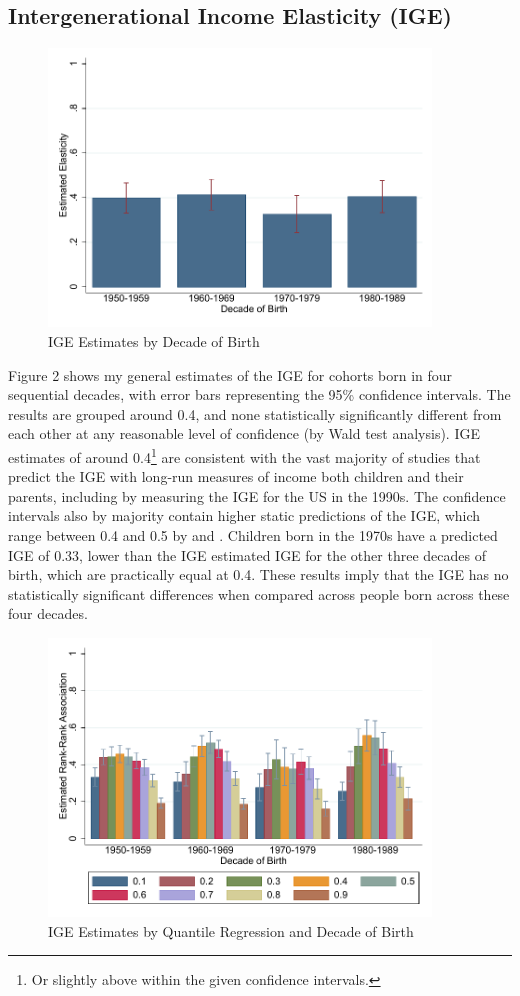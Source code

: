 \documentclass[notitlepage,12pt]{article}
\begin{document}
\subsection{Intergenerational Income Elasticity (IGE)}
\begin{figure}[H]
  \centering
  \caption{IGE Estimates by Decade of Birth}
  \includegraphics[width=4in]{Graph1.pdf}
\end{figure}
Figure 2 shows my general estimates of the IGE for cohorts born in four sequential decades, with error bars representing the 95\% confidence intervals.  The results are grouped around 0.4, and none statistically significantly different from each other at any reasonable level of confidence (by Wald test analysis).  IGE estimates of around 0.4\footnote{Or slightly above within the given confidence intervals.} are consistent with the vast majority of studies that predict the IGE with long-run measures of income both children and their parents, including by \cite{solon1999intergenerational} measuring the IGE for the US in the 1990s.  The confidence intervals also by majority contain higher static predictions of the IGE, which range between 0.4 and 0.5 by \cite{solon1992intergenerational} and \cite{zimmerman1992regression}.  Children born in the 1970s have a predicted IGE of 0.33, lower than the IGE estimated IGE for the other three decades of birth, which are practically equal at 0.4.  These results imply that the IGE has no statistically significant differences when compared across people born across these four decades.
\begin{figure}
  \centering
  \caption{IGE Estimates by Quantile Regression and Decade of Birth}
  \includegraphics[width=4in]{Graph22.pdf}
\end{figure}
\end{document}
